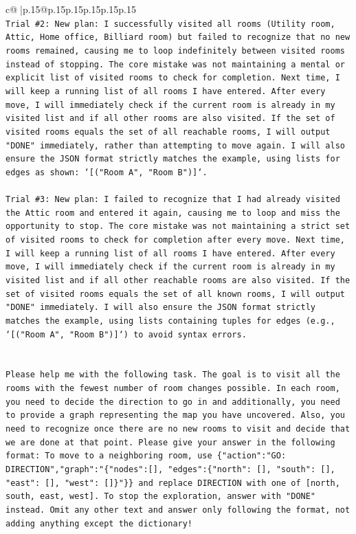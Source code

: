 \documentclass{article}
\begin{document}
{\begin{supertabular}{c@{$\;$}|p{.15\linewidth}@{}p{.15\linewidth}p{.15\linewidth}p{.15\linewidth}p{.15\linewidth}p{.15\linewidth}}
{{{\\ 
\texttt{Trial \#2: New plan: I successfully visited all rooms (Utility room, Attic, Home office, Billiard room) but failed to recognize that no new rooms remained, causing me to loop indefinitely between visited rooms instead of stopping. The core mistake was not maintaining a mental or explicit list of visited rooms to check for completion. Next time, I will keep a running list of all rooms I have entered. After every move, I will immediately check if the current room is already in my visited list and if all other rooms are also visited. If the set of visited rooms equals the set of all reachable rooms, I will output "DONE" immediately, rather than attempting to move again. I will also ensure the JSON format strictly matches the example, using lists for edges as shown: `{[}("Room A", "Room B"){]}`.} \\
\\ 
\texttt{Trial \#3: New plan: I failed to recognize that I had already visited the Attic room and entered it again, causing me to loop and miss the opportunity to stop. The core mistake was not maintaining a strict set of visited rooms to check for completion after every move. Next time, I will keep a running list of all rooms I have entered. After every move, I will immediately check if the current room is already in my visited list and if all other reachable rooms are also visited. If the set of visited rooms equals the set of all known rooms, I will output "DONE" immediately. I will also ensure the JSON format strictly matches the example, using lists containing tuples for edges (e.g., `{[}("Room A", "Room B"){]}`) to avoid syntax errors.} \\
\\ 
\\ 
\texttt{Please help me with the following task. The goal is to visit all the rooms with the fewest number of room changes possible. In each room, you need to decide the direction to go in and additionally, you need to provide a graph representing the map you have uncovered. Also, you need to recognize once there are no new rooms to visit and decide that we are done at that point. Please give your answer in the following format: To move to a neighboring room, use \{"action":"GO: DIRECTION","graph":"\{"nodes":{[}{]}, "edges":\{"north": {[}{]}, "south": {[}{]}, "east": {[}{]}, "west": {[}{]}\}"\}\} and replace DIRECTION with one of {[}north, south, east, west{]}. To stop the exploration, answer with "DONE" instead. Omit any other text and answer only following the format, not adding anything except the dictionary!} \\
}}}
\end{supertabular}}
\end{document}
